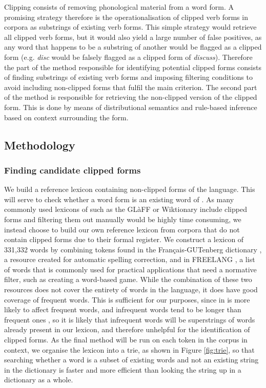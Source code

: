 \documentclass[output=paper,colorlinks,citecolor=brown]{langscibook}
\begin{document}
Clipping consists of removing phonological material from a word form. A promising strategy therefore is the operationalisation of clipped verb forms in corpora as substrings of existing verb forms. This simple strategy would retrieve all clipped verb forms, but it would also yield a large number of false positives, as any word that happens to be a substring of another would be flagged as a clipped form (e.g. \textit{disc} would be falsely flagged as a clipped form of \textit{discuss}). Therefore the part of the method responsible for identifying potential clipped forms consists of finding substrings of existing verb forms and imposing filtering conditions to avoid including non-clipped forms that fulfil the main criterion. The second part of the method is responsible for retrieving the non-clipped version of the clipped form. This is done by means of distributional semantics and rule-based inference based on context surrounding the form.

\subsection{Methodology}\label{sec:corpus:methodology}

\subsubsection{Finding candidate clipped forms}
We build a reference lexicon containing non-clipped forms of the language. This will serve to check whether a word form is an existing word of . As many commonly used lexicons of  such as the GLàFF \citep{hathoutsajouscalderone2014} or Wiktionary include clipped forms and filtering them out manually would be highly time consuming, we instead choose to build our own reference lexicon from corpora that do not contain clipped forms due to their formal register. We construct a lexicon of 331,332 words by combining tokens found in the Français-GUTenberg dictionary \citep{pythoud1999}, a resource created for automatic spelling correction, and in FREELANG \citep{vivier2003}, a list of  words that is commonly used for practical applications that need a normative filter, such as creating a word-based game. While the combination of these two resources does not cover the entirety of words in the  language, it does have good coverage of frequent words. This is sufficient for our purposes, since  in  is more likely to affect frequent words, and infrequent words tend to be longer than frequent ones \citep{zipf1949, zipf1935}, so it is likely that infrequent words will be superstrings of words already present in our lexicon, and therefore unhelpful for the identification of clipped forms. 
As the final method will be run on each token in the corpus in context, we organise the lexicon into a trie, as shown in Figure \ref{fig:trie}, so that searching whether a word is a subset of existing words and not an existing string in the dictionary is faster and more efficient than looking the string up in a dictionary as a whole. 
\end{document}

